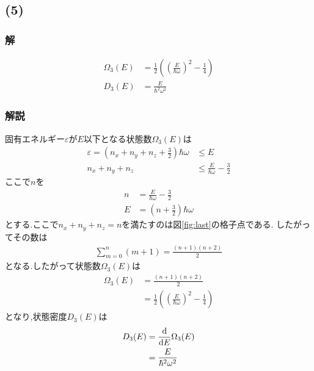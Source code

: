 \subsection*{(5)}
\subsubsection*{解}
\begin{align*}
  \Omega_3(E)&=\frac{1}{2}\left(\left(\frac{E}{\hbar\omega}\right)^2-\frac{1}{4}\right)\\
  D_3(E)&=\frac{E}{\hbar^2\omega^2}
\end{align*}
\hrulefill
\subsubsection*{解説}
固有エネルギー$\varepsilon$が$E$以下となる状態数$\Omega_3(E)$は
\begin{align}
  \varepsilon=\left(n_x+n_y+n_z+\frac{3}{2}\right)\hbar\omega&\leq E\\
  n_x+n_y+n_z&\leq \frac{E}{\hbar\omega}-\frac{3}{2}
\end{align}
ここで$n$を
\begin{align}
  n&=\frac{E}{\hbar\omega}-\frac{3}{2}\\
  E&=(n+\frac{3}{2})\hbar\omega
\end{align}
とする.ここで$n_x+n_y+n_z=n$を満たすのは図\ref{fig:last}の格子点である.
したがってその数は
\begin{align*}
  \sum_{m=0}^{n}(m+1)=\frac{(n+1)(n+2)}{2}
\end{align*}
となる.したがって状態数$\Omega_3(E)$は
\begin{align}
  \Omega_3(E)&=\frac{(n+1)(n+2)}{2}\\
  &=\frac{1}{2}\left(\left(\frac{E}{\hbar\omega}\right)^2-\frac{1}{4}\right)
\end{align}
となり,状態密度$D_3(E)$は
\begin{align}
  D_3(E)&=\frac{{\rm d}}{{\rm d}E}\Omega_3(E)\\
  &=\frac{E}{\hbar^2\omega^2}
\end{align}

